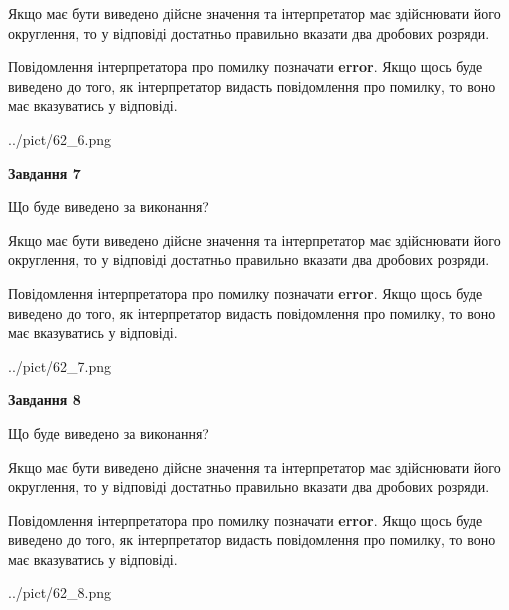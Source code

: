 \documentclass[12pt, ukrainian]{article}
\begin{document}
{\begin {Large}
Якщо має бути виведено дійсне значення та інтерпретатор має здійснювати його округлення, 
то у відповіді достатньо правильно вказати два дробових розряди.

Повідомлення інтерпретатора про помилку позначати \textbf{error}.
Якщо щось буде виведено до того, як інтерпретатор видасть повідомлення про помилку, 
то воно має вказуватись у відповіді. \par

\begin{center}
	{../pict/62_6.png}
\end{center}
\newpage

{\begin {center}\textbf{Завдання 7}\end {center}}\par
Що буде виведено за виконання? \par

Якщо має бути виведено дійсне значення та інтерпретатор має здійснювати його округлення, 
то у відповіді достатньо правильно вказати два дробових розряди.

Повідомлення інтерпретатора про помилку позначати \textbf{error}.
Якщо щось буде виведено до того, як інтерпретатор видасть повідомлення про помилку, 
то воно має вказуватись у відповіді. \par

\begin{center}
	{../pict/62_7.png}
\end{center}
\newpage

{\begin {center}\textbf{Завдання 8}\end {center}}\par
Що буде виведено за виконання? \par

Якщо має бути виведено дійсне значення та інтерпретатор має здійснювати його округлення, 
то у відповіді достатньо правильно вказати два дробових розряди.

Повідомлення інтерпретатора про помилку позначати \textbf{error}.
Якщо щось буде виведено до того, як інтерпретатор видасть повідомлення про помилку, 
то воно має вказуватись у відповіді. \par

\begin{center}
	{../pict/62_8.png}
\end{center}
\newpage


\end{Large}}
\end{document}
